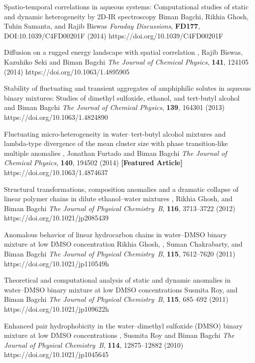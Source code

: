 \begin{cvpubs}
%
        {Spatio-temporal correlations in aqueous systems:
         Computational studies of static and dynamic heterogeneity by 2D-IR spectroscopy}
        {Biman Bagchi, Rikhia Ghosh, Tuhin Samanta, \selfauthor{} and Rajib Biswas}
        {{\slshape Faraday Discussions}, {\bfseries FD177}, DOI:10.1039/C4FD00201F (2014)}
        {https://doi.org/10.1039/C4FD00201F}

%
        {Diffusion on a rugged energy landscape with spatial correlation}
        {\selfauthor{}, Rajib Biswas, Kazuhiko Seki and Biman Bagchi}
        {{\slshape The Journal of Chemical Physics}, {\bfseries 141}, 124105 (2014)}
        {https://doi.org/10.1063/1.4895905}


%
        {Stability of fluctuating and transient aggregates of amphiphilic solutes
        in aqueous binary mixtures: Studies of dimethyl sulfoxide, ethanol, and tert-butyl alcohol}
        {\selfauthor{} and Biman Bagchi}
        {{\slshape The Journal of Chemical Physics}, {\bfseries 139}, 164301 (2013)}
        {https://doi.org/10.1063/1.4824890}

%
        {Fluctuating micro-heterogeneity in water--tert-butyl alcohol mixtures and
        lambda-type divergence of the mean cluster size with phase transition-like
        multiple anomalies}
        {\selfauthor{}, Jonathan Furtado and Biman Bagchi}
        {{\slshape The Journal of Chemical Physics}, {\bfseries 140}, 194502 (2014) {\bfseries [Featured Article]}}
        {https://doi.org/10.1063/1.4874637}

%
        {Structural transformations, composition anomalies and a dramatic
        collapse of linear polymer chains in dilute ethanol--water mixtures}
        {\selfauthor{}, Rikhia Ghosh, and Biman Bagchi}
        {{\slshape The Journal of Physical Chemistry~B}, {\bfseries 116}, 3713--3722 (2012)}
        {https://doi.org/10.1021/jp2085439}

%
        {Anomalous behavior of linear hydrocarbon chains in water--DMSO
        binary mixture at low DMSO concentration}
        {Rikhia Ghosh, \selfauthor{}, Suman Chakrabarty, and Biman Bagchi}
        {{\slshape The Journal of Physical Chemistry~B}, {\bfseries 115}, 7612--7620 (2011)}
        {https://doi.org/10.1021/jp110549h}

%
        {Theoretical and computational analysis of static and dynamic anomalies
        in water--DMSO binary mixture at low DMSO concentrations}
        {Susmita Roy, \selfauthor{} and Biman Bagchi}
        {{\slshape The Journal of Physical Chemistry~B}, {\bfseries 115}, 685--692 (2011)}
        {https://doi.org/10.1021/jp109622h}

%
        {Enhanced pair hydrophobicity in the water--dimethyl sulfoxide (DMSO)
        binary mixture at low DMSO concentrations}
        {\selfauthor{}, Susmita Roy and Biman Bagchi}
        {{\slshape The Journal of Physical Chemistry~B}, {\bfseries 114}, 12875--12882 (2010)}
        {https://doi.org/10.1021/jp1045645}

\end{cvpubs}
